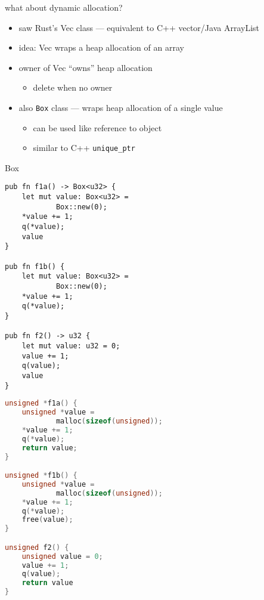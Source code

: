 \begin{frame}{what about dynamic allocation?}
    \begin{itemize}
    \item saw Rust's Vec class --- equivalent to C++ vector/Java ArrayList
    \item idea: Vec wraps a heap allocation of an array
    \item owner of Vec ``owns'' heap allocation
        \begin{itemize}
        \item delete when no owner
        \end{itemize}
    \item also \texttt{Box} class --- wraps heap allocation of a single value
        \begin{itemize}
        \item can be used like reference to object
        \item similar to C++ \texttt{unique\_ptr}
        \end{itemize}
    \end{itemize}
\end{frame}

\begin{frame}[fragile]{Box}
\begin{minipage}{0.48\textwidth}
\begin{verbatim}
pub fn f1a() -> Box<u32> {
    let mut value: Box<u32> =
            Box::new(0);
    *value += 1;
    q(*value);
    value
}

pub fn f1b() {
    let mut value: Box<u32> =
            Box::new(0);
    *value += 1;
    q(*value);
}

pub fn f2() -> u32 {
    let mut value: u32 = 0;
    value += 1;
    q(value);
    value
}
\end{verbatim}
\end{minipage}
\begin{minipage}{0.48\textwidth}
\begin{lstlisting}[language=C++,style=script]
unsigned *f1a() {
    unsigned *value =
            malloc(sizeof(unsigned));
    *value += 1;
    q(*value);
    return value;
}

unsigned *f1b() {
    unsigned *value =
            malloc(sizeof(unsigned));
    *value += 1;
    q(*value);
    free(value);
}

unsigned f2() {
    unsigned value = 0;
    value += 1;
    q(value);
    return value
}
\end{lstlisting}
\end{minipage}
\end{frame}
